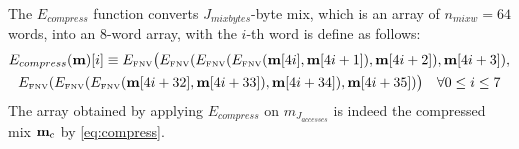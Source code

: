 The $E_{compress}$ function converts $J_{mixbytes}$-byte mix,
which is an array of $n_{mixw}=64$ words,
into an 8-word array, with the $i$-th word is define as follows:
\begin{multline}
	E_{compress}(\mathbf{m})[i] \equiv E_\text{\tiny FNV}\big(E_\text{\tiny FNV}(E_\text{\tiny FNV}(E_\text{\tiny FNV}(\mathbf{m}[4i], \mathbf{m}[4i + 1]), \mathbf{m}[4i + 2]), \mathbf{m}[4i + 3]), \\
	E_\text{\tiny FNV}(E_\text{\tiny FNV}(E_\text{\tiny FNV}(\mathbf{m}[4i+32], \mathbf{m}[4i +33]), \mathbf{m}[4i + 34]), \mathbf{m}[4i + 35])\big)\quad \forall 0\le i \le 7
\end{multline}
The array obtained by applying $E_{compress}$ on $m_{J_{accesses}}$ is indeed the compressed mix $\mathbf{m}_{\mathrm{c}}$ by \cref{eq:compress}.


